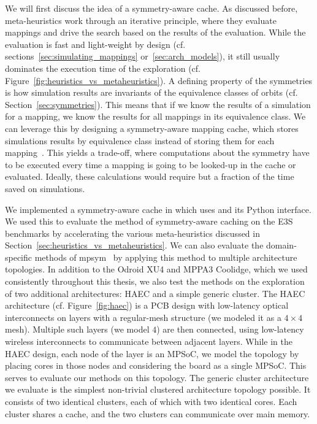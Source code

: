 We will first discuss the idea of a symmetry-aware cache.
As discussed before, meta-heuristics work through an iterative principle, where they evaluate mappings and drive the search based on the results of the evaluation.
While the evaluation is fast and light-weight by design (cf. sections~\ref{sec:simulating_mappings} or~\ref{sec:arch_models}), it still usually dominates the execution time of the exploration (cf. Figure~\ref{fig:heuristics_vs_metaheuristics}).
A defining property of the symmetries is how simulation results are invariants of the equivalence classes of orbits (cf. Section~\ref{sec:symmetries}).
This means that if we know the results of a simulation for a mapping, we know the results for all mappings in its equivalence class.
We can leverage this by designing a symmetry-aware mapping cache, which stores simulations results by equivalence class instead of storing them for each mapping~\cite{goens_taco17}.
This yields a trade-off, where computations about the symmetry have to be executed every time a mapping is going to be looked-up in the cache or evaluated.
Ideally, these calculations would require but a fraction of the time saved on simulations.

We implemented a symmetry-aware cache in \mocasin which uses \mpsym and its Python interface.
We used this to evaluate the method of symmetry-aware caching on the \ac{E3S} benchmarks by accelerating the various meta-heuristics discussed in Section~\ref{sec:heuristics_vs_metaheuristics}.
We can also evaluate the domain-specific methods of mpsym~\cite{goens_tcad21} by applying this method to multiple architecture topologies.
In addition to the Odroid XU4 and MPPA3 Coolidge, which we used consistently throughout this thesis, we also test the methods on the exploration of two additional architectures: \ac{HAEC} and a simple generic cluster.
The \ac{HAEC} architecture (cf. Figure~\ref{fig:haec}) is a \ac{PCB} design with low-latency optical interconnects on layers with a regular-mesh structure (we modeled it as a $4 \times 4$ mesh).
Multiple such layers (we model $4$) are then connected, using low-latency wireless interconnects to communicate between adjacent layers.
While in the \ac{HAEC} design, each node of the layer is an \ac{MPSoC}, we model the topology by placing cores in those nodes and considering the board as a single \ac{MPSoC}.
This serves to evaluate our methods on this topology.
The generic cluster architecture we evaluate is the simplest non-trivial clustered architecture topology possible.
It consists of two identical clusters, each of which with two identical cores.
Each cluster shares a cache, and the two clusters can communicate over main memory.

